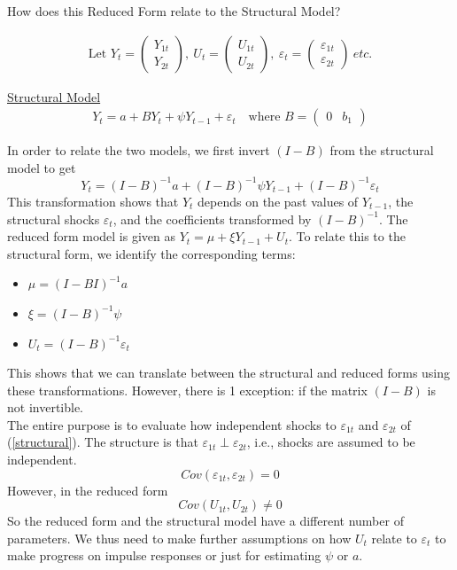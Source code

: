 How does this Reduced Form relate to the Structural Model? 

\begin{align*}
    \text{Let } Y_t = \begin{pmatrix}
        Y_{1t} \\
        Y_{2t}
    \end{pmatrix},\ U_t = \begin{pmatrix}
        U_{1t} \\
        U_{2t}
    \end{pmatrix},\  \varepsilon_t = \begin{pmatrix}
        \varepsilon_{1t}\\
        \varepsilon_{2t}
    \end{pmatrix} \ etc.
\end{align*}

\underline{Structural Model}
\begin{align*}
    Y_t = a + BY_t + \psi Y_{t-1} + \varepsilon_t \quad \text{where } B=\begin{pmatrix}
        0 & b_1  
    \end{pmatrix}
\end{align*}

In order to relate the two models, we first invert $(I-B)$ from the structural model to get \[
Y_t = (I-B)^{-1} a + (I-B)^{-1} \psi Y_{t-1}+ (I-B)^{-1}\varepsilon_t
\]
This transformation shows that $Y_t$ depends on the past values of $Y_{t-1}$, the structural shocks $\varepsilon_t$, and the coefficients transformed by $(I-B)^{-1}$. The reduced form model is given as $Y_t = \mu + \xi Y_{t-1} + U_t$. To relate this to the structural form, we identify the corresponding terms:
\begin{itemize}
    \item $\mu = (I-BI)^{-1} a$
    \item $\xi = (I-B)^{-1} \psi$
    \item $U_t = (I-B)^{-1} \varepsilon_t$
\end{itemize}

This shows that we can translate between the structural and reduced forms using these transformations. However, there is 1 exception: if the matrix $(I-B)$ is not invertible. \\

The entire purpose is to evaluate how independent shocks to $\varepsilon_{1t}$ and $\varepsilon_{2t}$ of (\ref{structural}). The structure is that $\varepsilon_{1t} \perp \varepsilon_{2t}$, i.e., shocks are assumed to be independent. \[
Cov(\varepsilon_{1t}, \varepsilon_{2t}) = 0
\]
However, in the reduced form \[
Cov(U_{1t},U_{2t})\neq 0
\] So the reduced form and the structural model have a different number of parameters. We thus need to make further assumptions on how $U_t$ relate to $\varepsilon_t$ to make progress on impulse responses or just for estimating $\psi$ or $a$.\\

